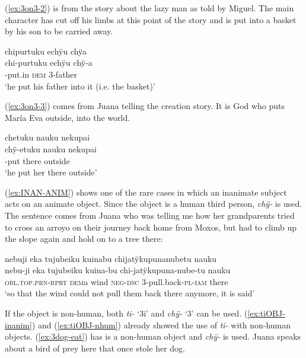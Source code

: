 
(\ref{ex:3on3-2}) is from the story about the lazy man as told by Miguel. The main character has cut off his limbs at this point of the story and is put into a basket by his son to be carried away.

\ea\label{ex:3on3-2}
\begingl 
\glpreamble chipurtuku echÿu chÿa\\
\gla chi-purtuku echÿu chÿ-a\\ 
-put.in \textsc{dem} 3-father\\ 
\glft ‘he put his father into it (i.e. the basket)’
\trailingcitation{[mox-n110920l.120]}
\xe

(\ref{ex:3on3-3}) comes from Juana telling the creation story. It is God who puts María Eva outside, into the world.

\ea\label{ex:3on3-3}
\begingl 
\glpreamble chetuku nauku nekupai\\
\gla chÿ-etuku nauku nekupai\\ 
-put there outside\\ 
\glft ‘he put her there outside’
\trailingcitation{[jxx-n101013s-1.359]}
\xe

(\ref{ex:INAN-ANIM}) shows one of the rare cases in which an inanimate subject acts on an animate object. Since the object is a human third person, \textit{chÿ-} is used. The sentence comes from Juana who was telling me how her grandparents tried to cross an arroyo on their journey back home from Moxos, but had to climb up the slope again and hold on to a tree there:
 
 \ea\label{ex:INAN-ANIM}
\begingl 
\glpreamble nebuji eka tujubeiku kuinabu chijatÿkupunanubetu nauku\\
\gla nebu-ji eka tujubeiku kuina-bu chi-jatÿkupuna-nube-tu nauku\\ 
\textsc{obl.top.prn}-\textsc{rprt} \textsc{dem}a wind \textsc{neg}-\textsc{dsc} 3-pull.back-\textsc{pl}-\textsc{iam} there\\ 
\glft ‘so that the wind could not pull them back there anymore, it is said’
\trailingcitation{[jxx-p151016l-2.120-121]}
\xe
{}

If the object is non-human, both \textit{ti-} ‘3i’ and \textit{chÿ-} ‘3’ can be used. (\ref{ex:tiOBJ-inanim}) and (\ref{ex:tiOBJ-nhum}) already showed the use of \textit{ti-} with non-human objects. (\ref{ex:3dog-eat}) has is a non-human object and \textit{chÿ-} is used. Juana speaks about a bird of prey here that once stole her dog.

